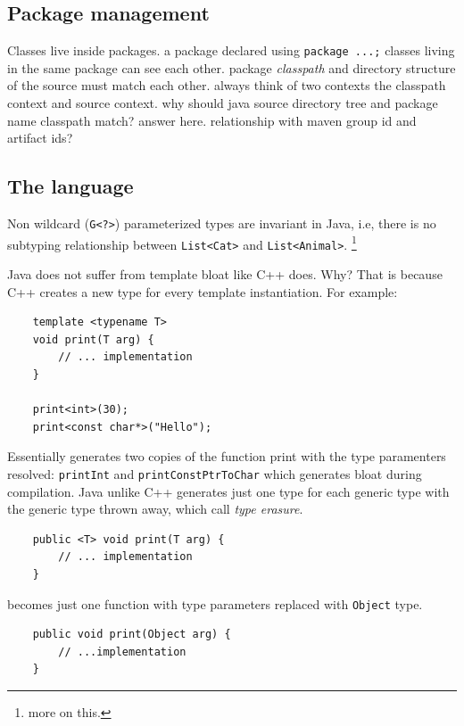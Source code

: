 \documentclass[a4paper]{article}
\begin{document}
\subsection*{Package management}
Classes live inside packages. a package declared using \lstinline{package ...;} classes living in the same 
package can see each other. package \emph{classpath} and directory structure of the source must match each other. 
always think of two contexts the classpath context and source context. why should java source directory tree and
package name classpath match? answer here. relationship with maven group id and artifact ids?

\subsection*{The language}

Non wildcard (\lstinline{G<?>}) parameterized types are invariant in Java, i.e, there is no subtyping relationship between
\lstinline{List<Cat>} and \lstinline{List<Animal>}. \footnote{more on this.}

Java does not suffer from template bloat like C++ does. Why? That is because C++ creates a new type for every template 
instantiation. For example:

\lstset{style=custom-cpp}
\begin{lstlisting}
    template <typename T>
    void print(T arg) {
        // ... implementation
    }

    print<int>(30);
    print<const char*>("Hello");
\end{lstlisting}

Essentially generates two copies of the function print with the type paramenters resolved: \lstinline{printInt} and
\lstinline{printConstPtrToChar} which generates bloat during compilation. Java unlike C++ generates just one type for each
generic type with the generic type thrown away, which call \emph{type erasure}.

\lstset{style=custom-java}
\begin{lstlisting}
    public <T> void print(T arg) {
        // ... implementation
    }
\end{lstlisting}

\begin{flushleft}
    becomes just one function with type parameters replaced with \lstinline{Object} type.    
\end{flushleft}

\begin{lstlisting}
    public void print(Object arg) {
        // ...implementation
    }
\end{lstlisting}
\end{document}
